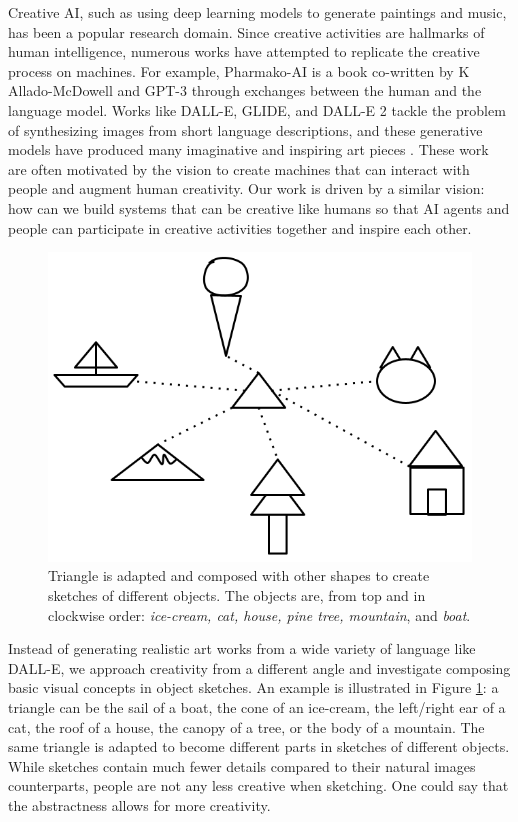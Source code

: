 Creative AI, such as using deep learning models to generate paintings and music, has been a popular research domain.
Since creative activities are hallmarks of human intelligence, numerous works have attempted to replicate the creative process on machines.
For example, Pharmako-AI \citep{allado-mcdowell_okojie_2020} is a book co-written by K Allado-McDowell and GPT-3 \citep{gpt3} through exchanges between the human and the language model. 
Works like DALL-E, GLIDE, and DALL-E 2 tackle the problem of synthesizing images from short language descriptions, and these generative models have produced many imaginative and inspiring art pieces \citep{dallePaper,glidePaper,dalle2Paper}.
These work are often motivated by the vision to create machines that can interact with people and augment human creativity.  
Our work is driven by a similar vision: how can we build systems that can be creative like humans so that AI agents and people can participate in creative activities together and inspire each other. 

\begin{figure}[!htb]
\centering
\includegraphics[width=.3\linewidth]{introduction/sketch_composition.png}  
\caption{Triangle is adapted and composed with other shapes to create sketches of different objects. The objects are, from top and in clockwise order: \textit{ice-cream, cat, house, pine tree, mountain}, and \textit{boat}.}
\label{introduction.composition}
\end{figure}

Instead of generating realistic art works from a wide variety of language like DALL-E, we approach creativity from a different angle and investigate composing basic visual concepts in object sketches.
An example is illustrated in Figure \ref{introduction.composition}: a triangle can be the sail of a boat, the cone of an ice-cream, the left/right ear of a cat, the roof of a house, the canopy of a tree, or the body of a mountain. The same triangle is adapted to become different parts in sketches of different objects. 
While sketches contain much fewer details compared to their natural images counterparts, people are not any less creative when sketching. One could say that the abstractness allows for more creativity. 

